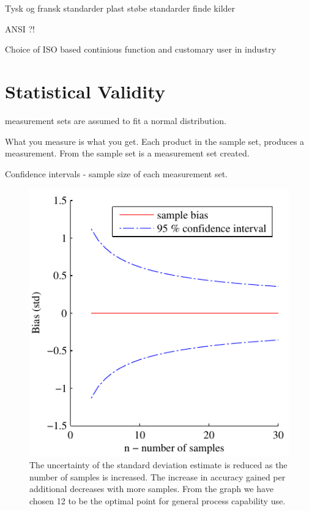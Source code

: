 \documentclass[aip,amsmath, reprint, author-year]{revtex4-1}
\begin{document}
Tysk og fransk standarder plast støbe standarder
finde kilder

ANSI ?!

Choice of ISO based continious function and customary user in industry

\section{Statistical Validity}

measurement sets are assumed to fit a normal distribution.

What you measure is what you get.
Each product in the sample set, produces a measurement. From the sample set is a  measurement set created. 

Confidence intervals - sample size of each measurement set.

\begin{figure}
\includegraphics{stats_bias_confidence.pdf}
\caption{\label{fig:std_uncertainty}The uncertainty of the standard deviation estimate is reduced as the number of samples is increased. The increase in accuracy gained per additional decreases with more samples. From the graph we have chosen 12 to be the optimal point for general process capability use.}
\end{figure}
\end{document}
